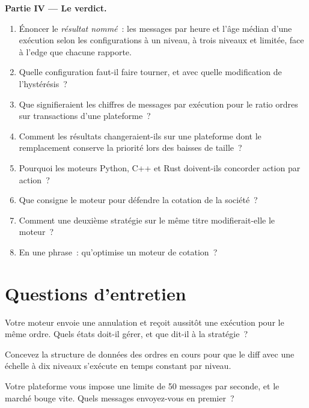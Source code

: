 \begin{problem}
\medskip\noindent\textbf{Partie IV --- Le verdict.}
\begin{enumerate}[resume]
\item Énoncer le \emph{résultat nommé}~: les messages par heure et l'âge médian d'une exécution selon les configurations à un niveau, à trois niveaux et limitée,
face à l'edge que chacune rapporte.
\item Quelle configuration faut-il faire tourner, et avec quelle modification de l'hystérésis~?
\item Que signifieraient les chiffres de messages par exécution pour le ratio ordres sur transactions d'une plateforme~?
\item Comment les résultats changeraient-ils sur une plateforme dont le remplacement conserve la priorité lors des baisses de taille~?
\item Pourquoi les moteurs Python, C++ et Rust doivent-ils concorder action par action~?
\item Que consigne le moteur pour défendre la cotation de la société~?
\item Comment une deuxième stratégie sur le même titre modifierait-elle le moteur~?
\item En une phrase~: qu'optimise un moteur de cotation~?
\end{enumerate}
\end{problem}

\section{Questions d'entretien}

\begin{interviewq}\label{iq:hf:the-quoting-engine:1}
Votre moteur envoie une annulation et reçoit aussitôt une exécution pour le même ordre. Quels états doit-il gérer, et que dit-il à la stratégie~?
\end{interviewq}

\begin{interviewq}\label{iq:hf:the-quoting-engine:2}
Concevez la structure de données des ordres en cours pour que le diff avec une échelle à dix niveaux s'exécute en temps constant par niveau.
\end{interviewq}

\begin{interviewq}\label{iq:hf:the-quoting-engine:3}
Votre plateforme vous impose une limite de 50 messages par seconde, et le marché bouge vite. Quels messages envoyez-vous en premier~?
\end{interviewq}

